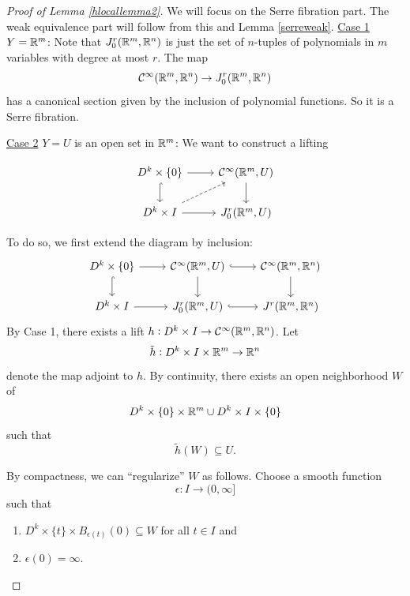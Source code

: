 \documentclass{article}
\newtheorem{proposed work}[theorem]{Proposed Work}
\theoremstyle{definition}
\begin{document}
\begin{proof}[Proof of Lemma \ref{hlocallemma2}]
We will focus on the Serre fibration part. The weak equivalence part
will follow from this and Lemma \ref{serreweak}.
\newline
\noindent\underline{Case 1} $Y = \mathbb R^m$:
\newline
Note that $J^r_0(\mathbb R^m,\mathbb R^n)$ is just the set of $n$-tuples of
polynomials in $m$ variables with degree at most $r$. The map
\begin{equation*}
\mathcal C^\infty(\mathbb R^m,\mathbb R^n) \to  J_0^r(\mathbb R^m,\mathbb R^n)
\end{equation*}
has a canonical section given by the inclusion of polynomial
functions. So it is a Serre fibration.
\newline

\noindent\underline{Case 2} $Y = U$ is an open set in $\mathbb R^m$:
\newline
We want to construct a lifting

\begin{equation*}
\begin{tikzcd}
D^k\times \{0\} \ar[r] \ar[d, hook] & \cC^\infty(\R^m,U) \ar[d] \\
D^k\times I \ar[ur, dashed]\ar[r] & J^r_0(\R^m,U)
\end{tikzcd}
\end{equation*}

To do so, we first extend the diagram by inclusion:
\begin{equation*}
\begin{tikzcd}
D^k\times \{0\} \ar[r] \ar[d, hook] & \cC^\infty(\R^m,U) \ar[d] \ar[r, hook] &
\cC^\infty(\R^m, \R^n) \ar[d] \\
D^k\times I \ar[r] & J^r_0(\R^m,U) \ar[r, hook] & J^r(\R^m, \R^n)
\end{tikzcd}
\end{equation*}
By Case 1, there exists a lift $h: D^k\times I \to \mathcal C^\infty(\mathbb R^m,\mathbb R^n)$. Let
\begin{equation*}
\tilde{h}: D^k\times I\times \mathbb R^m \to \mathbb R^n
\end{equation*}
denote the map adjoint to $h$. By continuity, there exists an open
neighborhood $W$ of
\begin{equation*}
D^k\times\{0\}\times\mathbb R^m \cup D^k\times I \times\{0\}
\end{equation*}
such that
\begin{equation*}
\tilde{h}(W) \subseteq U.
\end{equation*}

By compactness, we can ``regularize'' $W$ as follows. Choose a smooth
function
\begin{equation*}
\epsilon: I \to (0,\infty]
\end{equation*}
such that
\begin{enumerate}
\item $D^k\times\{t\}\times B_{\epsilon(t)}(0) \subseteq W$ for all
$t \in I$ and
\item $\epsilon(0) = \infty$.
\end{enumerate}


\end{proof}
\end{document}
